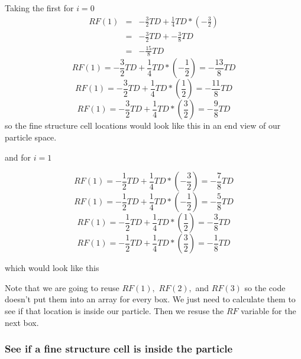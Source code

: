 \documentclass{article}
\begin{document}
Taking the first for $i=0$%
\begin{eqnarray*}
RF(1) &=&-\frac{3}{2}TD+\frac{1}{4}TD\ast (-\frac{3}{2}) \\
&=&-\frac{3}{2}TD+-\frac{3}{8}TD \\
&=&-\frac{15}{8}TD
\end{eqnarray*}
\[
RF(1)=-\frac{3}{2}TD+\frac{1}{4}TD\ast (-\frac{1}{2})=-\frac{13}{8}TD 
\]
\[
RF(1)=-\frac{3}{2}TD+\frac{1}{4}TD\ast (\frac{1}{2})=-\frac{11}{8}TD 
\]
\[
RF(1)=-\frac{3}{2}TD+\frac{1}{4}TD\ast (\frac{3}{2})=-\frac{9}{8}TD 
\]%
so the fine structure cell locations would look like this in an end view of
our particle space.

and for $i=1$

\[
RF(1)=-\frac{1}{2}TD+\frac{1}{4}TD\ast (-\frac{3}{2})=\allowbreak -\frac{7}{8%
}TD 
\]%
\[
RF(1)=-\frac{1}{2}TD+\frac{1}{4}TD\ast (-\frac{1}{2})=-\frac{5}{8}TD 
\]
\[
RF(1)=-\frac{1}{2}TD+\frac{1}{4}TD\ast (\frac{1}{2})=-\frac{3}{8}TD 
\]
\[
RF(1)=-\frac{1}{2}TD+\frac{1}{4}TD\ast (\frac{3}{2})=-\frac{1}{8}TD 
\]

which would look like this

Note that we are going to reuse $RF(1),$ $RF(2),$ and $RF(3)$ so the code
doesn't put them into an array for every box. We just need to calculate them
to see if that location is inside our particle. Then we resuse the $RF$
variable for the next box.

\subsubsection{See if a fine structure cell is inside the particle}
\end{document}
